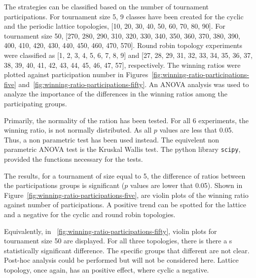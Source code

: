 The strategies can be classified based on the number of tournament
participations. For tournament size 5, 9 classes have been created for
the cyclic and the periodic lattice topologies, [10, 20, 30, 40, 50, 60, 70, 80, 90].
For tournament
size 50, [270, 280, 290, 310, 320, 330, 340, 350, 360, 370, 380, 390, 400, 410,
420, 430, 440, 450, 460, 470, 570]. Round robin topology
experiments were classified as [1, 2, 3, 4, 5, 6, 7, 8, 9] and
[27, 28, 29, 31, 32, 33, 34, 35, 36, 37, 38, 39, 40, 41, 42, 43, 44, 45, 46, 47, 57],
respectively. The winning ratios were plotted against participation number
in Figures~\ref{fig:winning-ratio-participations-five} and~\ref{fig:winning-ratio-participations-fifty}.
An ANOVA analysis was used to analyze the importance of the
differences in the winning ratios among the participating groups.

Primarily, the normality of the ration has been tested. For all 6 experiments,
the winning ratio, is not normally distributed. As all \(p\) values are
less that 0.05. Thus, a non parametric test has been used instead. The equivelent
non parametric ANOVA test is the Kruskal Wallis test. The python library
\texttt{scipy}, provided the functions necessary for the tests.


The results, for a tournament of size equal to 5, the difference
of ratios between the participations groups is significant (\(p\) values
are lower that 0.05). Shown in Figure~\ref{fig:winning-ratio-participations-five},
are violin plots of the winning ratio against number of participations.
A positive trend can be spotted for the lattice and a negative for the cyclic
and round robin topologies.

Equivalently, in ~\ref{fig:winning-ratio-participations-fifty}, violin plots for
tournament size 50 are displayed. For all three topologies, there is there  a s
statistically significant difference. The specific groups that different are not
clear. Post-hoc analysis could be performed but will not be considered here.
Lattice topology, once again, has an positive effect, where cyclic a negative.

